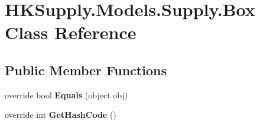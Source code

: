 \hypertarget{class_h_k_supply_1_1_models_1_1_supply_1_1_box}{}\section{H\+K\+Supply.\+Models.\+Supply.\+Box Class Reference}
\label{class_h_k_supply_1_1_models_1_1_supply_1_1_box}
\subsection*{Public Member Functions}
\begin{DoxyCompactItemize}
\item 
\mbox{\label{class_h_k_supply_1_1_models_1_1_supply_1_1_box_abd7b57c302ed4539c639babeed6e21f7}} 
override bool {\bfseries Equals} (object obj)
\item 
\mbox{\label{class_h_k_supply_1_1_models_1_1_supply_1_1_box_a6f0b43de39d0914ef25eb7c9a8355b71}} 
override int {\bfseries Get\+Hash\+Code} ()
\end{DoxyCompactItemize}
